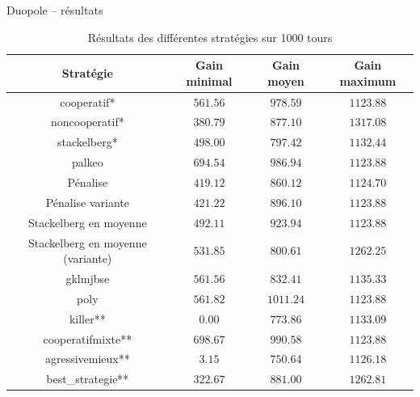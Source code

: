\documentclass{beamer}
\begin{document}
\begin{frame}{Duopole -- résultats}
  \tiny{%
    \begin{table}[f]
      \centering
      \begin{tabular}{|c||c|c|c|}
        \hline
        Stratégie      & Gain minimal & Gain moyen & Gain maximum \\\hline\hline
         cooperatif* & $561.56$ & $978.59$ & $1123.88$ \\\hline
      noncooperatif* & $380.79$ & $877.10$ & $1317.08$ \\\hline
        stackelberg* & $498.00$ & $797.42$ & $1132.44$ \\\hline
              palkeo & $694.54$ & $986.94$ & $1123.88$ \\\hline
            Pénalise & $419.12$ & $860.12$ & $1124.70$ \\\hline
   Pénalise variante & $421.22$ & $896.10$ & $1123.88$ \\\hline
Stackelberg en moyenne & $492.11$ & $923.94$ & $1123.88$ \\\hline
Stackelberg en moyenne (variante) & $531.85$ & $800.61$ & $1262.25$ \\\hline
            gklmjbse & $561.56$ & $832.41$ & $1135.33$ \\\hline
                poly & $561.82$ & $1011.24$ & $1123.88$ \\\hline
            killer** & $  0.00$ & $773.86$ & $1133.09$ \\\hline
   cooperatifmixte** & $698.67$ & $990.58$ & $1123.88$ \\\hline
    agressivemieux** & $  3.15$ & $750.64$ & $1126.18$ \\\hline
   best\_strategie** & $322.67$ & $881.00$ & $1262.81$ \\\hline
      \end{tabular}
      \caption{Résultats des différentes stratégies sur 1000 tours}
      \label{table:coop_results2}
    \end{table}
  }
\end{frame}
\end{document}
